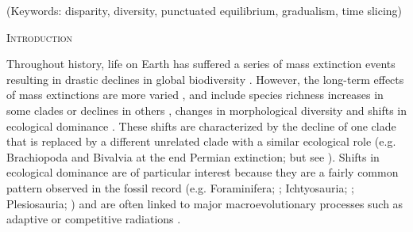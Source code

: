 \documentclass[12pt,letterpaper]{article}
\renewcommand{\section}[1]{%
\bigskip
\begin{center}
\begin{Large}
\normalfont\scshape #1
\medskip
\end{Large}
\end{center}}
\begin{document}
\noindent (Keywords: disparity, diversity, punctuated equilibrium, gradualism, time slicing)\\
\vspace{1.5in}

\newpage 

%
%

\section{Introduction}
Throughout history, life on Earth has suffered a series of mass extinction events resulting in drastic declines in global biodiversity \citep[e.g.][]{RaupPT,BentonPT,rennetime2013,Brusatte2015}.
However, the long-term effects of mass extinctions are more varied \citep{Erwin1998344}, and include species richness increases in some clades \citep{friedmanexplosive2010} or declines in others \citep{Benton85}, changes in morphological diversity \citep{Ciampaglio2001,Ciampaglio2004,kornextinction2013} and shifts in ecological dominance \citep[e.g.][]{Brusatte12092008,toljagictriassic-jurassic2013,bensonfaunal2014}.
These shifts are characterized by the decline of one clade that is replaced by a different unrelated clade with a similar ecological role (e.g. Brachiopoda and Bivalvia at the end Permian extinction; \citealt{Sepkiski1981,CLAPHAM01102006} but see \citealt{Payne22052014}). 
Shifts in ecological dominance are of particular interest because they are a fairly common pattern observed in the fossil record (e.g. Foraminifera; \citealt{D'Hondt01011996,Coxall01042006}; Ichtyosauria; \citealt{thorneresetting2011}; Plesiosauria; \citealt{bensonfaunal2014}) and are often linked to major macroevolutionary processes such as adaptive \citep{Losos2010} or competitive radiations \citep{Brusatte12092008}.
\end{document}
